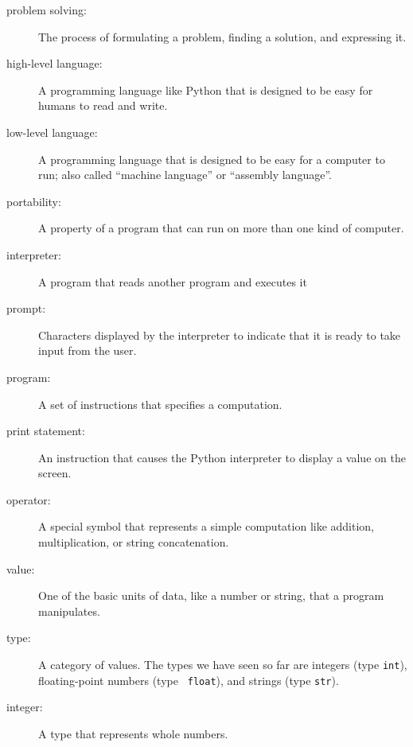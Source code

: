 \begin{description}

\item[problem solving:]  The process of formulating a problem, finding
a solution, and expressing it.

\item[high-level language:]  A programming language like Python that
is designed to be easy for humans to read and write.

\item[low-level language:]  A programming language that is designed
to be easy for a computer to run; also called ``machine language'' or
``assembly language''.

\item[portability:]  A property of a program that can run on more
than one kind of computer.

\item[interpreter:]  A program that reads another program and executes
it

\item[prompt:] Characters displayed by the interpreter to indicate
that it is ready to take input from the user.

\item[program:] A set of instructions that specifies a computation.

\item[print statement:]  An instruction that causes the Python
interpreter to display a value on the screen.

\item[operator:]  A special symbol that represents a simple computation like
addition, multiplication, or string concatenation.

\item[value:]  One of the basic units of data, like a number or string,
that a program manipulates.

\item[type:] A category of values.  The types we have seen so far
are integers (type {\tt int}), floating-point numbers (type {\tt
float}), and strings (type {\tt str}).

\item[integer:] A type that represents whole numbers.


\end{description}
